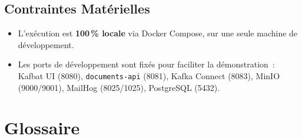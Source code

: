 \documentclass[12pt,a4paper,openany]{report}
\begin{document}
    \section{Contraintes Mat\'erielles}

    \begin{itemize}
      \item L'ex\'ecution est \textbf{100\,\% locale} via Docker Compose, sur une seule machine de d\'eveloppement.
      \item Les ports de d\'eveloppement sont fix\'es pour faciliter la d\'emonstration~: Kafbat UI (8080), \texttt{documents-api} (8081), Kafka Connect (8083), MinIO (9000/9001), MailHog (8025/1025), PostgreSQL (5432).
    \end{itemize}

    \chapter{Glossaire}
\end{document}
